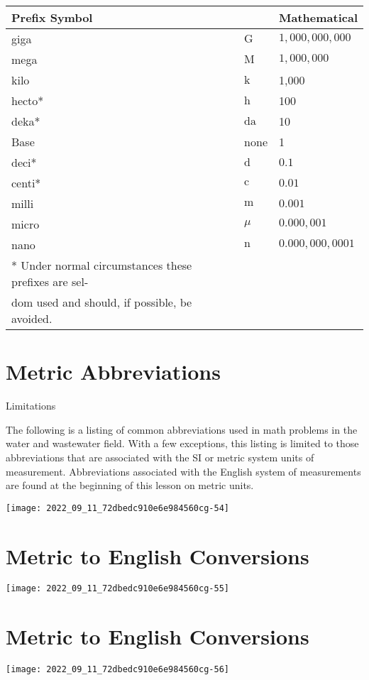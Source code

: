 \begin{tabular}{|l|l|l|}
\hline
\multicolumn{2}{|l|}{Prefix Symbol} & \multicolumn{1}{l|}{Mathematical} \\
\hline
giga & $\mathrm{G}$ & $1,000,000,000$ \\
mega & $\mathrm{M}$ & $1,000,000$ \\
kilo & $\mathrm{k}$ & 1,000 \\
hecto* & $\mathrm{h}$ & 100 \\
deka* & $\mathrm{da}$ & 10 \\
Base & none & 1 \\
deci* & $\mathrm{d}$ & $0.1$ \\
centi* & $\mathrm{c}$ & $0.01$ \\
milli & $\mathrm{m}$ & $0.001$ \\
micro & $\mu$ & $0.000,001$ \\
nano & $\mathrm{n}$ & $0.000,000,0001$ \\
\hline
* Under normal circumstances these prefixes are sel- &  &  \\
dom used and should, if possible, be avoided. &  &  \\
\hline
\end{tabular}

\section{Metric Abbreviations}
Limitations

The following is a listing of common abbreviations used in math problems in the water and wastewater field. With a few exceptions, this listing is limited to those abbreviations that are associated with the SI or metric system units of measurement. Abbreviations associated with the English system of measurements are found at the beginning of this lesson on metric units.

\texttt{[image: 2022\_09\_11\_72dbedc910e6e984560cg-54]}

\section{Metric to English Conversions}
\texttt{[image: 2022\_09\_11\_72dbedc910e6e984560cg-55]}

\section{Metric to English Conversions}
\texttt{[image: 2022\_09\_11\_72dbedc910e6e984560cg-56]}

